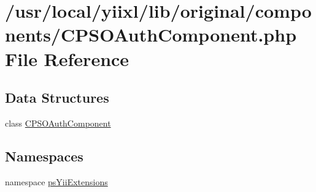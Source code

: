 \hypertarget{CPSOAuthComponent_8php}{
\section{/usr/local/yiixl/lib/original/components/CPSOAuthComponent.php File Reference}
\label{CPSOAuthComponent_8php}
}
\subsection*{Data Structures}
\begin{DoxyCompactItemize}
\item 
class \hyperlink{classCPSOAuthComponent}{CPSOAuthComponent}
\end{DoxyCompactItemize}
\subsection*{Namespaces}
\begin{DoxyCompactItemize}
\item 
namespace \hyperlink{namespacepsYiiExtensions}{psYiiExtensions}
\end{DoxyCompactItemize}
